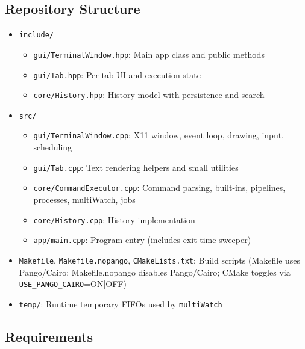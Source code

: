\documentclass[11pt,a4paper]{article}
\begin{document}
\subsection{Repository Structure}
\begin{itemize}[leftmargin=*]
  \item \texttt{include/}
    \begin{itemize}
      \item \texttt{gui/TerminalWindow.hpp}: Main app class and public methods
      \item \texttt{gui/Tab.hpp}: Per-tab UI and execution state
      \item \texttt{core/History.hpp}: History model with persistence and search
    \end{itemize}
  \item \texttt{src/}
    \begin{itemize}
      \item \texttt{gui/TerminalWindow.cpp}: X11 window, event loop, drawing, input, scheduling
      \item \texttt{gui/Tab.cpp}: Text rendering helpers and small utilities
      \item \texttt{core/CommandExecutor.cpp}: Command parsing, built-ins, pipelines, processes, multiWatch, jobs
      \item \texttt{core/History.cpp}: History implementation
      \item \texttt{app/main.cpp}: Program entry (includes exit-time sweeper)
    \end{itemize}
  \item \texttt{Makefile}, \texttt{Makefile.nopango}, \texttt{CMakeLists.txt}: Build scripts (Makefile uses Pango/Cairo; Makefile.nopango disables Pango/Cairo; CMake toggles via \texttt{USE\_PANGO\_CAIRO}=ON|OFF)
  \item \texttt{temp/}: Runtime temporary FIFOs used by \texttt{multiWatch}
\end{itemize}

\subsection{Requirements}
\end{document}
